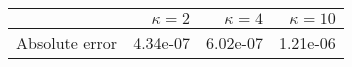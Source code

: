 \begin{tabular}{lrrr}
\toprule
 & $\kappa = 2$ & $\kappa = 4$ & $\kappa = 10$ \\
\midrule
Absolute error & 4.34e-07 & 6.02e-07 & 1.21e-06 \\
\bottomrule
\end{tabular}
